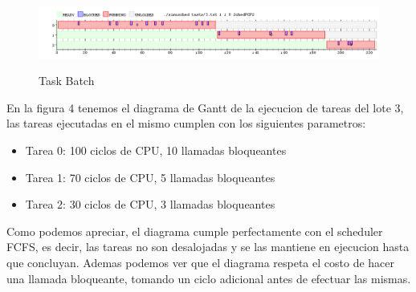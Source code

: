 \begin{figure}[h]
    \includegraphics[width=\linewidth]{images/3.png}
    \label{fig:Task Consola}
    \caption{Task Batch}
\end{figure}

En la figura 4 tenemos el diagrama de Gantt de la ejecucion de tareas del lote 3, las tareas ejecutadas en el mismo cumplen con los siguientes parametros:

\begin{itemize}
	\item Tarea 0: 100 ciclos de CPU, 10 llamadas bloqueantes
	\item Tarea 1: 70 ciclos de CPU, 5 llamadas bloqueantes
	\item Tarea 2: 30 ciclos de CPU, 3 llamadas bloqueantes
\end{itemize}

Como podemos apreciar, el diagrama cumple perfectamente con el scheduler FCFS, es decir, las tareas no son desalojadas y se las mantiene en ejecucion hasta que concluyan. Ademas podemos ver que el diagrama respeta el costo de hacer una llamada bloqueante, tomando un ciclo adicional antes de efectuar las mismas.